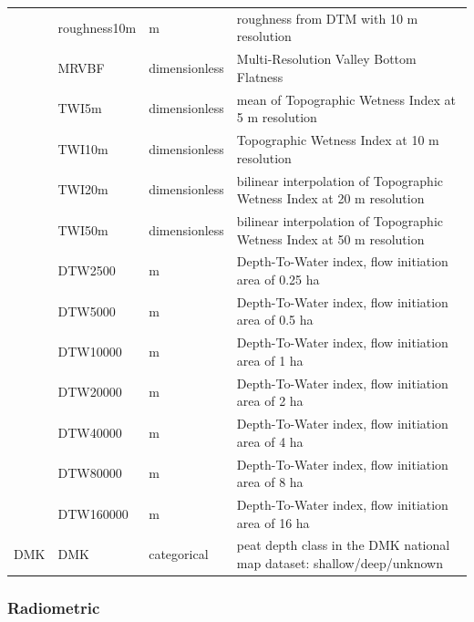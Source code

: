 \documentclass[soil, manuscript]{copernicus}
\begin{document}
\begin{table}[tbp]
\begin{tabular}{llll}
             & roughness10m & m                     & roughness from DTM with 10 m resolution                                \\
             & MRVBF        & dimensionless         & Multi-Resolution Valley Bottom Flatness                                \\
             & TWI5m        & dimensionless         & mean of Topographic Wetness Index at 5 m resolution                    \\
             & TWI10m       & dimensionless         & Topographic Wetness Index at 10 m resolution                           \\
             & TWI20m       & dimensionless         & bilinear interpolation of Topographic Wetness Index at 20 m resolution \\
             & TWI50m       & dimensionless         & bilinear interpolation of Topographic Wetness Index at 50 m resolution \\
             & DTW2500      & m                     & Depth-To-Water index, flow initiation area of 0.25 ha                  \\
             & DTW5000      & m                     & Depth-To-Water index, flow initiation area of 0.5 ha                   \\
             & DTW10000     & m                     & Depth-To-Water index, flow initiation area of 1 ha                     \\
             & DTW20000     & m                     & Depth-To-Water index, flow initiation area of 2 ha                     \\
             & DTW40000     & m                     & Depth-To-Water index, flow initiation area of 4 ha                     \\
             & DTW80000     & m                     & Depth-To-Water index, flow initiation area of 8 ha                     \\
             & DTW160000    & m                     & Depth-To-Water index, flow initiation area of 16 ha                    \\
DMK          & DMK          & categorical           & peat depth class in the DMK national map dataset: shallow/deep/unknown \\ \hline
\end{tabular}
\label{tab:preds}
\end{table}

\subsubsection{Radiometric}
\end{document}
